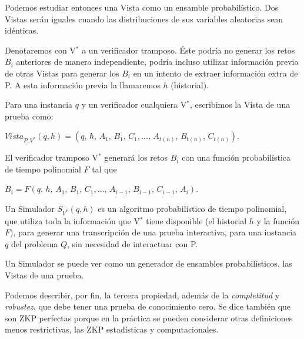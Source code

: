 Podemos estudiar entonces una Vista como un ensamble probabilístico. Dos Vistas serán iguales cuando las distribuciones de sus variables aleatorias sean idénticas.


\hfil

Denotaremos con V$^*$ a un verificador tramposo. Éste podría no generar los retos $B_i$ anteriores de manera independiente, podría incluso utilizar información previa de otras Vistas para generar los $B_i$ en un intento de extraer información extra de P. A esta información previa la llamaremos $h$ (historial).

Para una instancia $q$ y un verificador cualquiera V$^*$, escribimos la Vista de una prueba como:

\begin{center}
	$Vista_{P,V^*}(q,h) = (q,\,h,\,A_1,\,B_1,\,C_1, \dots ,\,A_{t(n)},\,B_{t(n)},\,C_{t(n)})$.
\end{center}

El verificador tramposo V$^*$ generará los retos $B_i$ con una función probabilística de tiempo polinomial $F$ tal que

\begin{center}
	$B_i = F(q,\,h,\,A_1,\,B_1,\,C_1, \dots ,\,A_{i-1},\,B_{i-1},\,C_{i-1},\,A_i)$.
\end{center}



\begin{definition}
	Un Simulador $S_{V^*}(q,h)$ es un algoritmo probabilístico de tiempo polinomial, que utiliza toda la información que V$^*$ tiene disponible (el historial $h$ y la función $F$), para generar una transcripción de una prueba interactiva, para una instancia $q$ del problema $Q$, sin necesidad de interactuar con P.
\end{definition}

Un Simulador se puede ver como un generador de ensambles probabilísticos, las Vistas de una prueba.


\hfil

Podemos describir, por fin, la tercera propiedad, además de la \textit{completitud} y \textit{robustez}, que debe tener una prueba de conocimiento cero. Se dice también que son ZKP perfectas porque en la práctica se pueden considerar otras definiciones menos restrictivas, las ZKP estadísticas y computacionales.



